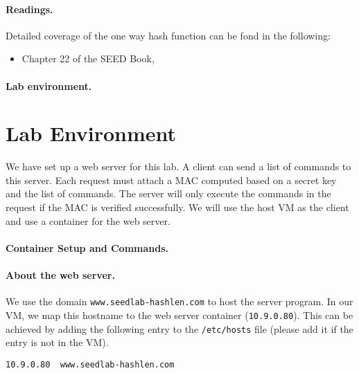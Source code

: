 \paragraph{Readings.} Detailed coverage of the one way hash function can be 
fond in the following: 

\begin{itemize}
\item Chapter 22 of the SEED Book, \seedbook
\end{itemize}


\paragraph{Lab environment.} 
\seedenvironmentB
\nodependency




\section{Lab Environment}

We have set up a web server for this lab. 
A client can send a list of commands to this server. 
Each request must attach a MAC computed based on a secret
key and the list of commands. The server will 
only execute the commands in the request if 
the MAC is verified successfully. 
We will use the host VM as the client and use 
a container for the web server.


\paragraph{Container Setup and Commands.}




\paragraph{About the web server.}
We use the domain \texttt{www.seedlab-hashlen.com} to host the server program. 
In our VM, we map this hostname to 
the web server container (\texttt{10.9.0.80}). This can be
achieved by adding the following entry to the 
\texttt{/etc/hosts} file (please add it if the entry is not 
in the VM).

\begin{lstlisting}
10.9.0.80  www.seedlab-hashlen.com
\end{lstlisting}


